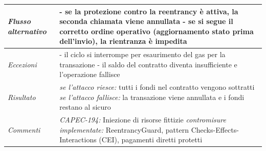 \begin{longtable}{| >{\columncolor{abuseCol}}p{} | p{} |}
\hline
\textit{Flusso alternativo} & - se la protezione contro la reentrancy è attiva, la seconda chiamata viene annullata \newline - se si segue il corretto ordine operativo (aggiornamento stato prima dell'invio), la rientranza è impedita \\
\hline
\textit{Eccezioni} & - il ciclo si interrompe per esaurimento del gas per la transazione \newline - il saldo del contratto diventa insufficiente e l'operazione fallisce \\
\hline
\textit{Risultato} & \textit{se l'attacco riesce:} tutti i fondi nel contratto vengono sottratti \newline \textit{se l'attacco fallisce:} la transazione viene annullata e i fondi restano al sicuro \\
\hline
\textit{Commenti} & \textit{CAPEC-194:} Iniezione di risorse fittizie \newline \textit{contromisure implementate:} ReentrancyGuard, pattern Checks-Effects-Interactions (CEI), pagamenti diretti protetti \\
\hline
\end{longtable}

